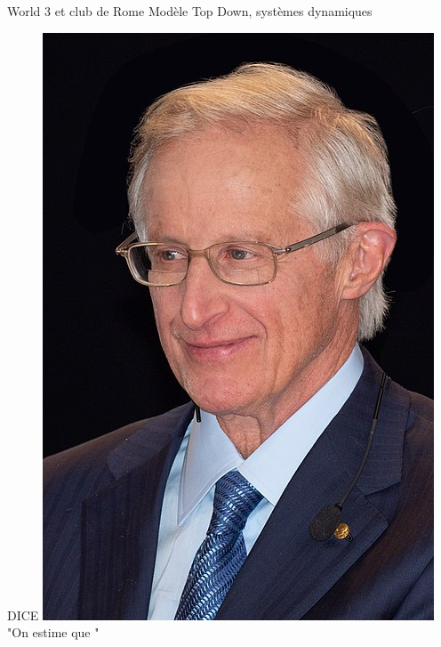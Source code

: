 \documentclass{beamer}
\begin{document}
\begin{frame}{World 3 et club de Rome}
Modèle Top Down, systèmes dynamiques
\end{frame}

\begin{frame}{DICE}
\includegraphics[scale=0.2]{images/Nordhaus.jpg}
"On estime que "
\end{frame}
\end{document}
